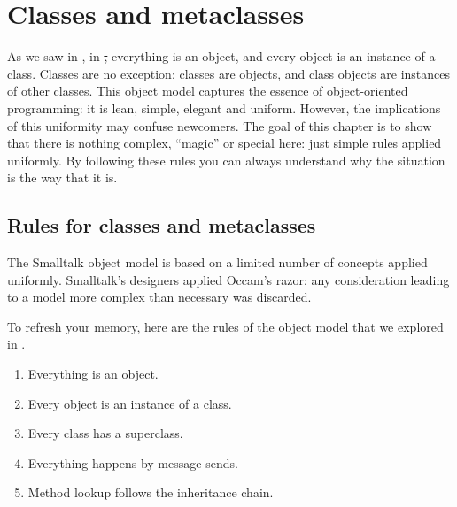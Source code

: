 \documentclass[a4paper,10pt,twoside]{book}
\begin{document}
	\renewcommand{\nnbb}[2]{} %
	\sloppy
\fi
\chapter{Classes and metaclasses}
\label{cha:metaclasses}


As we saw in , in \st, everything is an object, and every object is an instance of a class. Classes are no exception:
classes are objects, and class objects are instances of other classes.
This object model captures the essence of object-oriented programming: it is lean, simple, elegant and uniform. 
However, the implications of this uniformity may confuse newcomers. The goal of this chapter is to show that there is nothing complex, ``magic'' or special here: just simple rules applied uniformly.
By following these rules you can always understand why the situation is the way that it is.

\section{Rules for classes and metaclasses}

The Smalltalk object model is based on a limited number of concepts applied uniformly. 
Smalltalk's designers applied Occam's razor: any consideration leading to a model more complex than necessary was discarded.

To refresh your memory, here are the rules of the object model that we explored in .

\begin{enumerate}[label={\textbf{Rule \arabic{*}}.}, ref={Rule \arabic{*}}, leftmargin=*, widest=10]
\item{} %
	Everything is an object.

\item{} %
	Every object is an instance of a class.

\item{} %
	Every class has a superclass.

\item{} %
	Everything happens by message sends.

\item{} %
	Method lookup follows the inheritance chain.

\end{enumerate}
\end{document}
